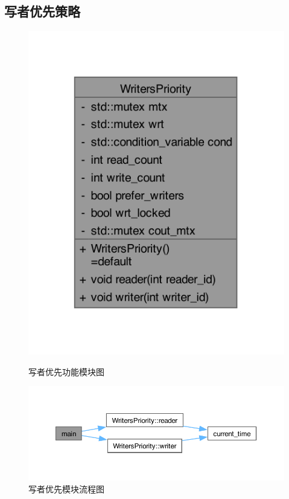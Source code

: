 \subsection{写者优先策略}
\begin{figure}[H]
    \centering
    \begin{minipage}[t]{0.25\textwidth}
        \centering
        \includegraphics[width=\textwidth]{images/writerclass.pdf}
        \caption{写者优先功能模块图}
    \end{minipage}
    \begin{minipage}[t]{0.65\textwidth}
        \centering
        \includegraphics[width=\textwidth]{images/writerflow.pdf}
        \caption{写者优先模块流程图}
    \end{minipage}
\end{figure}

